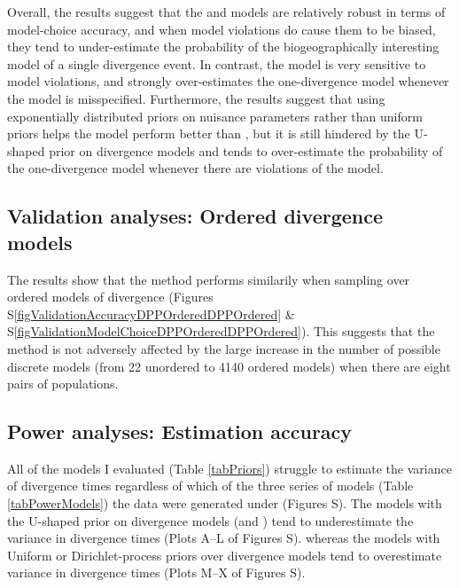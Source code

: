Overall, the results suggest that the \modelDPP and \modelUniform models are
relatively robust in terms of model-choice accuracy, and when model violations
do cause them to be biased, they tend to under-estimate the probability of the
biogeographically interesting model of a single divergence event.
In contrast, the \modelOld model is very sensitive to model violations, and
strongly over-estimates the one-divergence model whenever the model is
misspecified.
Furthermore, the results suggest that using exponentially distributed priors on
nuisance parameters rather than uniform priors helps the \modelUshaped model
perform better than \modelOld, but it is still hindered by the U-shaped prior
on divergence models and tends to over-estimate the probability of the
one-divergence model whenever there are violations of the model.


\subsection{Validation analyses: Ordered divergence models}
The results show that the method performs similarily when sampling over ordered
models of divergence
(Figures S\ref{figValidationAccuracyDPPOrderedDPPOrdered} \&
S\ref{figValidationModelChoiceDPPOrderedDPPOrdered}).
This suggests that the method is not adversely affected by the large increase
in the number of possible discrete models (from 22 unordered to 4140 ordered
models) when there are eight pairs of populations.

\subsection{Power analyses: Estimation accuracy}
All of the models I evaluated (Table \ref{tabPriors}) struggle to estimate the
variance of divergence times \divTimeDispersion regardless of which of the
three series of models (Table \ref{tabPowerModels}) the data were generated
under
(Figures
S).
The models with the U-shaped prior on divergence models (\modelOld and
\modelUshaped) tend to underestimate the variance in divergence times 
(Plots A--L of Figures
S).
whereas the models with Uniform or Dirichlet-process priors over divergence
models tend to overestimate variance in divergence times
(Plots M--X of Figures
S).

